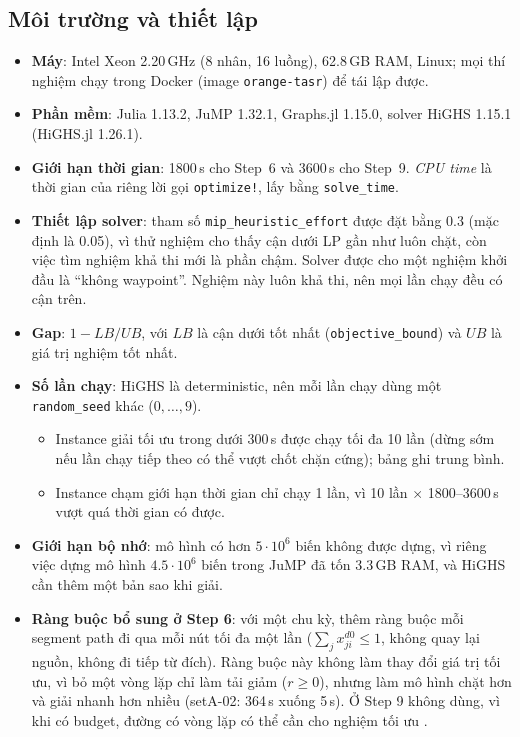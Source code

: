 \documentclass[11pt,a4paper]{article}
\begin{document}
\subsection{Môi trường và thiết lập}

\begin{itemize}
\item \textbf{Máy}: Intel Xeon 2.20\,GHz (8 nhân, 16 luồng), 62.8\,GB RAM, Linux; mọi thí nghiệm chạy trong Docker (image \texttt{orange-tasr}) để tái lập được.
\item \textbf{Phần mềm}: Julia 1.13.2, JuMP 1.32.1, Graphs.jl 1.15.0, solver HiGHS 1.15.1 (HiGHS.jl 1.26.1).
\item \textbf{Giới hạn thời gian}: 1800\,s cho Step~6 và 3600\,s cho Step~9. \emph{CPU time} là thời gian của riêng lời gọi \texttt{optimize!}, lấy bằng \texttt{solve\_time}.
\item \textbf{Thiết lập solver}: tham số \texttt{mip\_heuristic\_effort} được đặt bằng 0.3 (mặc định là 0.05), vì thử nghiệm cho thấy cận dưới LP gần như luôn chặt, còn việc tìm nghiệm khả thi mới là phần chậm. Solver được cho một nghiệm khởi đầu là ``không waypoint''. Nghiệm này luôn khả thi, nên mọi lần chạy đều có cận trên.
\item \textbf{Gap}: $1-LB/UB$, với $LB$ là cận dưới tốt nhất (\texttt{objective\_bound}) và $UB$ là giá trị nghiệm tốt nhất.
\item \textbf{Số lần chạy}: HiGHS là deterministic, nên mỗi lần chạy dùng một \texttt{random\_seed} khác ($0,\dots,9$).
  \begin{itemize}
  \item Instance giải tối ưu trong dưới 300\,s được chạy tối đa 10 lần (dừng sớm nếu lần chạy tiếp theo có thể vượt chốt chặn cứng); bảng ghi trung bình.
  \item Instance chạm giới hạn thời gian chỉ chạy 1 lần, vì 10 lần $\times$ 1800--3600\,s vượt quá thời gian có được.
  \end{itemize}
\item \textbf{Giới hạn bộ nhớ}: mô hình có hơn $5\cdot10^6$ biến không được dựng, vì riêng việc dựng mô hình $4.5\cdot10^6$ biến trong JuMP đã tốn 3.3\,GB RAM, và HiGHS cần thêm một bản sao khi giải.
\item \textbf{Ràng buộc bổ sung ở Step 6}: với một chu kỳ, thêm ràng buộc mỗi segment path đi qua mỗi nút tối đa một lần ($\sum_{j} x^{d0}_{ji}\le 1$, không quay lại nguồn, không đi tiếp từ đích). Ràng buộc này không làm thay đổi giá trị tối ưu, vì bỏ một vòng lặp chỉ làm tải giảm ($r\ge 0$), nhưng làm mô hình chặt hơn và giải nhanh hơn nhiều (setA-02: 364\,s xuống 5\,s). Ở Step 9 không dùng, vì khi có budget, đường có vòng lặp có thể cần cho nghiệm tối ưu \cite{benhamiche2026}.

\end{itemize}
\end{document}
